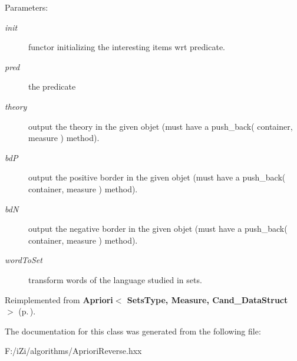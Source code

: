 \begin{Desc}
\item[Parameters:]
\begin{description}
\item[{\em init}]functor initializing the interesting items wrt predicate. \item[{\em pred}]the predicate \item[{\em theory}]output the theory in the given objet (must have a push\_\-back( container, measure ) method). \item[{\em bd\-P}]output the positive border in the given objet (must have a push\_\-back( container, measure ) method). \item[{\em bd\-N}]output the negative border in the given objet (must have a push\_\-back( container, measure ) method). \item[{\em word\-To\-Set}]transform words of the language studied in sets. \end{description}
\end{Desc}


Reimplemented from {\bf Apriori$<$ Sets\-Type, Measure, Cand\_\-Data\-Struct $>$} {\rm (p.\,\pageref{class_apriori_36d7a2cdad2a8c459f2b44e3ab460591})}.

The documentation for this class was generated from the following file:\begin{CompactItemize}
\item 
F:/i\-Zi/algorithms/Apriori\-Reverse.hxx\end{CompactItemize}
